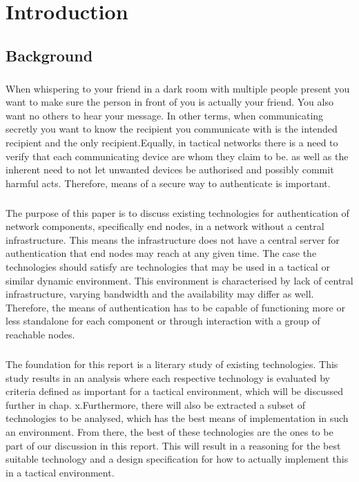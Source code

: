 \chapter{Introduction}

\section{Background}
\paragraph{}When whispering to your friend in a dark room with multiple people present you want to make sure the person in front of you is actually your friend. You also want no others to hear your message. In other terms, when communicating secretly you want to know the recipient you communicate with is the intended recipient and the only recipient.\newline Equally, in tactical networks there is a need to verify that each communicating device are whom they claim to be. as well as the inherent need to not let unwanted devices be authorised and possibly commit harmful acts. Therefore, means of a secure way to authenticate is important.

\paragraph{} The purpose of this paper is to discuss existing technologies for authentication of network components, specifically end nodes, in a network without a central infrastructure. This means the infrastructure does not have a central server for authentication that end nodes may reach at any given time. The case the technologies should satisfy are technologies that may be used in a tactical or similar dynamic environment. \newline
This environment is characterised by lack of central infrastructure, varying bandwidth and the availability may differ as well. Therefore, the means of authentication has to be capable of functioning more or less standalone for each component or through interaction with a group of reachable nodes.
\paragraph{} The foundation for this report is a literary study of existing technologies. This study results in an analysis where each respective technology is evaluated by criteria defined as important for a tactical environment, which will be discussed further in chap. x.\newline Furthermore, there will also be extracted a subset of technologies to be analysed, which has the best means of implementation in such an environment. From there, the best of these technologies are the ones to be part of our discussion in this report. This will result in a reasoning for the best suitable technology and a design specification for how to actually implement this in a tactical environment.

